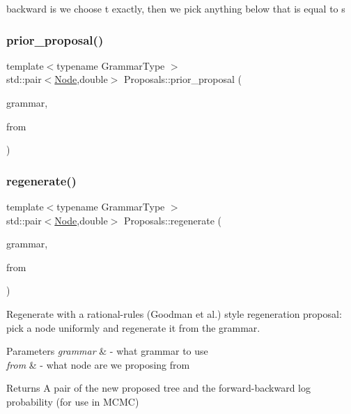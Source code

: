 backward is we choose t exactly, then we pick anything below that is equal to s \mbox{\label{namespace_proposals_add01a544339cc3713d02f663c331f33b}} 
\subsubsection{\texorpdfstring{prior\+\_\+proposal()}{prior\_proposal()}}
{\footnotesize\ttfamily template$<$typename Grammar\+Type $>$ \\
std\+::pair$<$\hyperlink{class_node}{Node},double$>$ Proposals\+::prior\+\_\+proposal (\begin{DoxyParamCaption}\item[{Grammar\+Type $\ast$}]{grammar,  }\item[{const \hyperlink{class_node}{Node} \&}]{from }\end{DoxyParamCaption})}

\mbox{\label{namespace_proposals_aedcca10b4519a9aad7739878036019f3}} 
\subsubsection{\texorpdfstring{regenerate()}{regenerate()}}
{\footnotesize\ttfamily template$<$typename Grammar\+Type $>$ \\
std\+::pair$<$\hyperlink{class_node}{Node},double$>$ Proposals\+::regenerate (\begin{DoxyParamCaption}\item[{Grammar\+Type $\ast$}]{grammar,  }\item[{const \hyperlink{class_node}{Node} \&}]{from }\end{DoxyParamCaption})}

Regenerate with a rational-\/rules (Goodman et al.) style regeneration proposal\+: pick a node uniformly and regenerate it from the grammar. 
\begin{DoxyParams}{Parameters}
{\em grammar} & -\/ what grammar to use \\
\hline
{\em from} & -\/ what node are we proposing from \\
\hline
\end{DoxyParams}
\begin{DoxyReturn}{Returns}
A pair of the new proposed tree and the forward-\/backward log probability (for use in M\+C\+MC)
\end{DoxyReturn}
